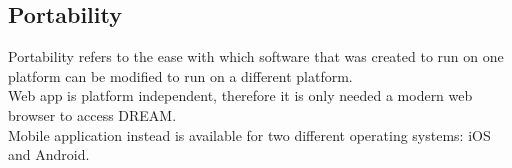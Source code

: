 \subsection{Portability}

Portability refers to the ease with which software that was created to run on one platform can be modified to run on a different platform.\\
Web app is platform independent, therefore it is only needed a modern web browser to access DREAM.\\
Mobile application instead is available for two different operating systems: iOS and Android.